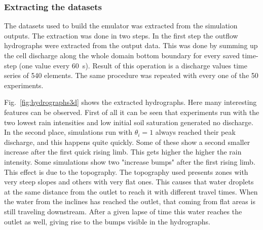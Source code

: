 \subsubsection{Extracting the datasets}




The datasets used to build the emulator was extracted from the simulation outputs.
The extraction was done in two steps.
In the first step the outflow hydrographs were extracted from the output data. 
This was done by summing up the cell discharge along the whole domain bottom boundary for every saved time-step (one value every \SI{60}{\second}).
Result of this operation is a discharge values time series of \num{540} elements.
The same procedure was repeated with every one of the \num{50} experiments.

Fig.~\ref{fig:hydrographs3d} shows the extracted hydrographs.
Here many interesting features can be observed.
First of all it can be seen that experiments run with the two lowest rain intensities and low initial soil saturation generated no discharge.
In the second place, simulations run with $\theta_i = \num{1}$ always reached their peak discharge, and this happens quite quickly.
Some of these show a second smaller increase after the first quick rising limb.
This gets higher the higher the rain intensity.
Some simulations show two "increase bumps" after the first rising limb.
This effect is due to the topography.
The topography used presents zones with very steep slopes and others with very flat ones.
This causes that water droplets at the same distance from the outlet to reach it with different travel times.
When the water from the inclines has reached the outlet, that coming from flat areas is still traveling downstream.
After a given lapse of time this water reaches the outlet as well, giving rise to the bumps visible in the hydrographs.\\

